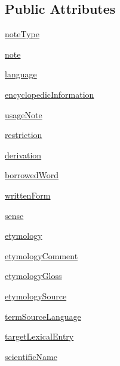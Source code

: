 \subsection*{Public Attributes}
\begin{DoxyCompactItemize}
\item 
\hyperlink{classsrc_1_1resources_1_1statement_1_1_statement_ac53cb41b348800e26e57013940576e57}{note\+Type}
\item 
\hyperlink{classsrc_1_1resources_1_1statement_1_1_statement_ac61a65478afc0b6ab2054d7b9304c21b}{note}
\item 
\hyperlink{classsrc_1_1resources_1_1statement_1_1_statement_aaefcfcf6b3d9d43c0210c424509dcbf7}{language}
\item 
\hyperlink{classsrc_1_1resources_1_1statement_1_1_statement_a189fd8f66328780bd39764b33b4220a7}{encyclopedic\+Information}
\item 
\hyperlink{classsrc_1_1resources_1_1statement_1_1_statement_afdefc898083509fe10cf5329c341e691}{usage\+Note}
\item 
\hyperlink{classsrc_1_1resources_1_1statement_1_1_statement_a310921cc6da12659a2bfa9818a4b2908}{restriction}
\item 
\hyperlink{classsrc_1_1resources_1_1statement_1_1_statement_a40efc05a7dcf877a81b850f7a0a8650a}{derivation}
\item 
\hyperlink{classsrc_1_1resources_1_1statement_1_1_statement_a2af3f38f0f4f4d98c824ba31979184b0}{borrowed\+Word}
\item 
\hyperlink{classsrc_1_1resources_1_1statement_1_1_statement_a95875344cd0ffd2a2fe81569114cb7d6}{written\+Form}
\item 
\hyperlink{classsrc_1_1resources_1_1statement_1_1_statement_ac3f2abe2f05fde8310b81312c85042b3}{sense}
\item 
\hyperlink{classsrc_1_1resources_1_1statement_1_1_statement_a48b1b474f5ffe8cc00be3ae662ce490e}{etymology}
\item 
\hyperlink{classsrc_1_1resources_1_1statement_1_1_statement_a2d906255b6faa8fdf058ce68b5f1b6ca}{etymology\+Comment}
\item 
\hyperlink{classsrc_1_1resources_1_1statement_1_1_statement_a9a25a5e6bbac5722c91a6d87026647d2}{etymology\+Gloss}
\item 
\hyperlink{classsrc_1_1resources_1_1statement_1_1_statement_a161a06117936940080d5266f401711d9}{etymology\+Source}
\item 
\hyperlink{classsrc_1_1resources_1_1statement_1_1_statement_a89ee2dec5b458b252254877fa54f899c}{term\+Source\+Language}
\item 
\hyperlink{classsrc_1_1resources_1_1statement_1_1_statement_a6ff34173dbdc734d3994fadd46e6e229}{target\+Lexical\+Entry}
\item 
\hyperlink{classsrc_1_1resources_1_1statement_1_1_statement_a4ca0fc81e7e5e019137c08904ad0c42a}{scientific\+Name}
\end{DoxyCompactItemize}


